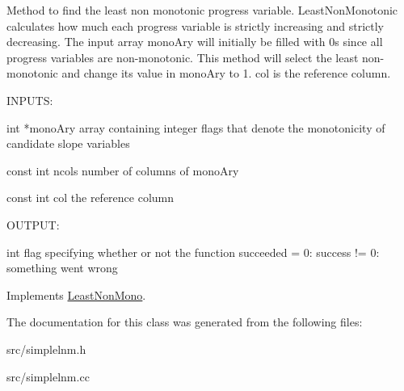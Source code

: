 Method to find the least non monotonic progress variable. LeastNonMonotonic calculates how much each progress variable is strictly increasing and strictly decreasing. The input array monoAry will initially be filled with 0s since all progress variables are non-\/monotonic. This method will select the least non-\/monotonic and change its value in monoAry to 1. col is the reference column.

\begin{DoxyVerb}
INPUTS: 

int *monoAry      array containing integer flags that denote the monotonicity of candidate slope variables

const int ncols   number of columns of monoAry

const int col     the reference column

OUTPUT:

int               flag specifying whether or not the function succeeded 
                   = 0: success
		  != 0: something went wrong

\end{DoxyVerb}
 

Implements \hyperlink{classLeastNonMono}{LeastNonMono}.

The documentation for this class was generated from the following files:\begin{DoxyCompactItemize}
\item 
src/simplelnm.h\item 
src/simplelnm.cc\end{DoxyCompactItemize}

